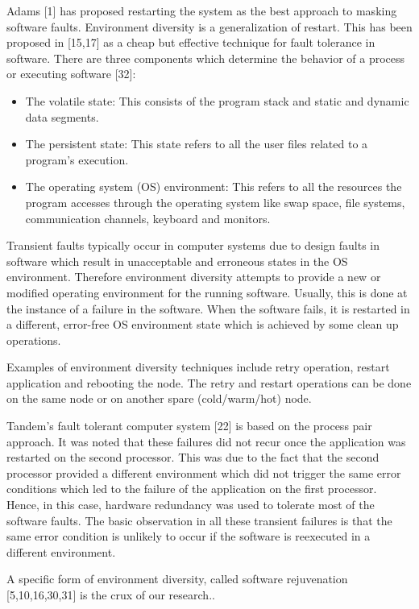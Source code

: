 \documentclass[oneside, a4paper, 11pt]{memoir}
\begin{document}
Adams [1] has proposed restarting the system as the best approach to masking software faults. Environment diversity is a generalization of restart. This has been proposed in [15,17] as a cheap but effective technique for fault tolerance in software. There are three components which determine the behavior of a process or executing software [32]:

\begin{itemize}
\item The volatile state: This consists of the program stack and static and dynamic data segments.
\item The persistent state: This state refers to all the user files related to a program's execution.
\item The operating system (OS) environment: This refers to all the resources the program accesses through the operating system like swap space, file systems, communication channels, keyboard and monitors.
\end{itemize}

Transient faults typically occur in computer systems due to design faults in software which result in unacceptable and erroneous states in the OS environment. Therefore environment diversity attempts to provide a new or modified operating environment for the running software. Usually, this is done at the instance of a failure in the software. When the software fails, it is restarted in a different, error-free OS environment state which is achieved by some clean up operations.

Examples of environment diversity techniques include retry operation, restart application and rebooting the node. The retry and restart operations can be done on the same node or on another spare (cold/warm/hot) node.

Tandem's fault tolerant computer system [22] is based on the process pair approach. It was noted that these failures did not recur once the application was restarted on the second processor. This was due to the fact that the second processor provided a different environment which did not trigger the same error conditions which led to the failure of the application on the first processor. Hence, in this case, hardware redundancy was used to tolerate most of the software faults. The basic observation in all these transient failures is that the same error condition is unlikely to occur if the software is reexecuted in a different environment.

A specific form of environment diversity, called software rejuvenation [5,10,16,30,31] is the crux of our research..
\end{document}
